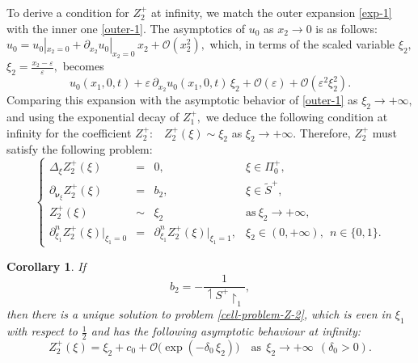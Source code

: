 \documentclass[reqno]{amsart}            %
\newtheorem{corollary}{Corollary}[section]
\numberwithin{equation}{section}
\begin{document}
	To derive a condition for $Z^+_2$ at infinity,  we match the outer expansion \eqref{exp-1} with the inner one \eqref{outer-1}. The asymptotics of $u_0$ as $x_2 \to 0$ is as follows: $u_0 = u_0|_{x_2=0} + \partial_{x_2}u_0|_{x_2=0}\, x_2 + \mathcal{O}(x_2^2),$ which, in terms of the scaled variable $ \xi_2,$ $\xi_2 = \frac{x_2 - \varepsilon}{\varepsilon},$ becomes
	$$
	u_0(x_1,0,t) + \varepsilon\, \partial_{x_2}u_0(x_1,0,t)\, \xi_2 +  \mathcal{O}(\varepsilon) +  \mathcal{O}(\varepsilon^2 \xi_2^2).
	$$
	Comparing this expansion with the asymptotic behavior of  \eqref{outer-1} as $\xi_2 \to +\infty,$ and using  the exponential decay of $Z^+_1,$  we deduce the following condition at infinity for the coefficient $Z^+_2:$ \ $Z^+_2(\xi) \sim \xi_2$ as $\xi_2 \to +\infty.$ Therefore,  $Z^+_2$ must satisfy  the following problem: 
	\begin{equation}\label{cell-problem-Z-2}
		\left\{
		\begin{array}{rcll}
			\Delta_{\xi}Z^+_2(\xi) & =& 0 , & \xi\in\Pi^+_0,
			\\[3pt]
			\partial_{\boldsymbol{\nu}_\xi}Z^+_2(\xi) &=&  b_2,
			&  \xi \in \tilde{S}^+,
			\\[3pt]
			Z^+_2(\xi) &\sim& \xi_2
			& \text{as} \  \xi_2 \to +\infty,
			\\[3pt]
			\partial^n_{\xi_1}Z^+_2(\xi)\big|_{\xi_1=0} &=& \partial^n_{\xi_1}Z^+_2(\xi)\big|_{\xi_1=1}, & \xi_2\in (0, +\infty), \ \ n\in\{0, 1\}.
		\end{array}
		\right.
	\end{equation}
	\begin{corollary}
		If 
		\begin{equation}\label{eq-19}
			b_2 = - \frac{1}{\upharpoonleft\!\! {S}^+\!\!\upharpoonright_1},
		\end{equation}
		then there is a unique solution to problem \eqref{cell-problem-Z-2}, which is even in $\xi_1$ with respect to $\frac12$ and has  the following  asymptotic behaviour at infinity:
		\begin{equation}\label{eq-20}
			Z^+_2(\xi) = \xi_2 + c_0 +  \mathcal{O}\big(\exp(-\delta_0 \, \xi_2) \big) \quad \text{as} \ \ \xi_2 \to +\infty \ \ (\delta_0 > 0).
		\end{equation}
	\end{corollary}
\end{document}
